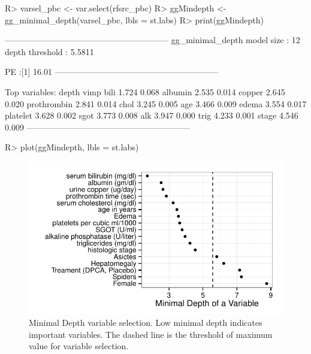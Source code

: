 \documentclass[nojss]{jss}\usepackage[]{graphicx}\usepackage[]{color}
\makeatletter
\def\maxwidth{ %
  \ifdim\Gin@nat@width>\linewidth
    \linewidth
  \else
    \Gin@nat@width
  \fi
}
\makeatother
\begin{document}
\begin{Schunk}
\begin{Sinput}
R> varsel_pbc <- var.select(rfsrc_pbc)
R> ggMindepth <- gg_minimal_depth(varsel_pbc, lbls = st.labs)
R> print(ggMindepth)
\end{Sinput}
\end{Schunk}

\begin{Schunk}
\begin{Soutput}
-----------------------------------------------------------
gg_minimal_depth
model size         : 12 
depth threshold    : 5.5811 

PE :[1] 16.01
-----------------------------------------------------------

Top variables:
            depth  vimp
bili        1.724 0.068
albumin     2.535 0.014
copper      2.645 0.020
prothrombin 2.841 0.014
chol        3.245 0.005
age         3.466 0.009
edema       3.554 0.017
platelet    3.628 0.002
sgot        3.773 0.008
alk         3.947 0.000
trig        4.233 0.001
stage       4.546 0.009
-----------------------------------------------------------
\end{Soutput}
\end{Schunk}

\begin{Schunk}
\begin{Sinput}
R> plot(ggMindepth, lbls = st.labs)
\end{Sinput}
\begin{figure}[!htpb]

{\centering \includegraphics[width=\maxwidth]{figure/rfs-mindepth-plot-1} 

}

\caption[Minimal Depth variable selection]{Minimal Depth variable selection. Low minimal depth indicates important variables. The dashed line is the threshold of maximum value for variable selection.\label{fig:mindepth-plot}}
\end{figure}
\end{Schunk}
\end{document}
